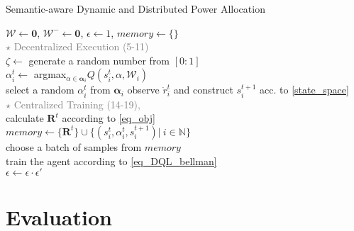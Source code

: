 \documentclass[conference]{IEEEtran}
\begin{document}
\begin{algorithm}[t!]\label{alg_sama_d3QL}
\caption{\small{Semantic-aware Dynamic and Distributed Power Allocation}}
$\boldsymbol{\mathcal{W}} \leftarrow \mathbf{0}$, $\boldsymbol{\mathcal{W}}^{-} \leftarrow \mathbf{0}$, $\epsilon \gets 1$, $memory \gets \{\}$ \\
{
    {
        \textcolor{gray}{$\star$ Decentralized Execution (5-11)}  \\
        {
            $\zeta \gets$ generate a random number from $[0:1]$ \\
            \If{$\zeta > \epsilon$}
            {
                $\alpha_{i}^{t} \gets$ argmax$_{\alpha \in \boldsymbol{\alpha}_{i}} Q({s}_{i}^{t}, \alpha, {\mathcal{W}}_{i})$ \\
            }
            \Else
            {
                select a random $\alpha_{i}^{t}$ from $\boldsymbol{\alpha}_{i}$
            }
            observe $\dot{r}_{i}^{t}$ and construct ${s}_{i}^{t+1}$ acc. to \eqref{state_space} \\
        }
        {
            \textcolor{gray}{$\star$ Centralized Training (14-19),} \\
            calculate $\boldsymbol{R}^{t}$ according to \eqref{eq_obj} \\
            $memory \gets \{ \boldsymbol{R}^{t} \} \cup \{({s}_{i}^{t}, \alpha_{i}^{t}, {s}_{i}^{t+1}) \big| \ i \in \mathbb{N} \}$ \\
            choose a batch of samples from $memory$\\
            train the agent according to \eqref{eq_DQL_bellman} \\
            \If{$\epsilon > \widetilde{\epsilon}$}
            {
                $\epsilon \gets \epsilon \cdot \epsilon'$
            }
        }
    }
}
\end{algorithm}



\section{Evaluation}\label{s_sim}
\end{document}

